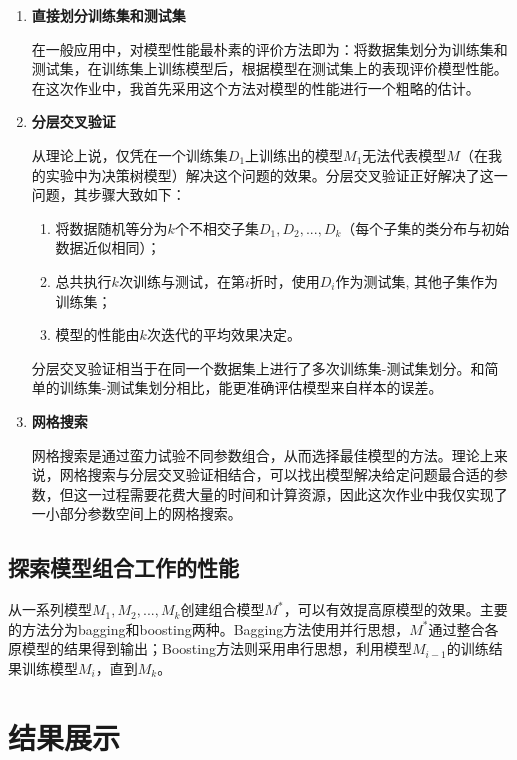 \documentclass[12pt,a4paper]{article}
\theoremstyle{definition}
\begin{document}
\begin{enumerate}
\item \textbf{直接划分训练集和测试集}

在一般应用中，对模型性能最朴素的评价方法即为：将数据集划分为训练集和测试集，在训练集上训练模型后，根据模型在测试集上的表现评价模型性能。在这次作业中，我首先采用这个方法对模型的性能进行一个粗略的估计。

\item \textbf{分层交叉验证}

从理论上说，仅凭在一个训练集$D_1$上训练出的模型$M_1$无法代表模型$M$（在我的实验中为决策树模型）解决这个问题的效果。分层交叉验证正好解决了这一问题，其步骤大致如下：

\begin{enumerate}
	\item 将数据随机等分为$k$个不相交子集$D_1, D_2, ... ,D_k$（每个子集的类分布与初始数据近似相同）；
	
	\item 总共执行$k$次训练与测试，在第$i$折时，使用$D_i$作为测试集, 其他子集作为训练集；
	
	\item 模型的性能由$k$次迭代的平均效果决定。
\end{enumerate}

分层交叉验证相当于在同一个数据集上进行了多次训练集-测试集划分。和简单的训练集-测试集划分相比，能更准确评估模型来自样本的误差。

\item \textbf{网格搜索}

网格搜索是通过蛮力试验不同参数组合，从而选择最佳模型的方法。理论上来说，网格搜索与分层交叉验证相结合，可以找出模型解决给定问题最合适的参数，但这一过程需要花费大量的时间和计算资源，因此这次作业中我仅实现了一小部分参数空间上的网格搜索。

\end{enumerate}

\subsection{探索模型组合工作的性能}

从一系列模型$M_1, M_2, ... , M_k$创建组合模型$M^*$，可以有效提高原模型的效果。主要的方法分为bagging和boosting两种。Bagging方法使用并行思想，$M^*$通过整合各原模型的结果得到输出；Boosting方法则采用串行思想，利用模型$M_{i-1}$的训练结果训练模型$M_{i}$，直到$M_k$。

\section{结果展示}
\end{document}
